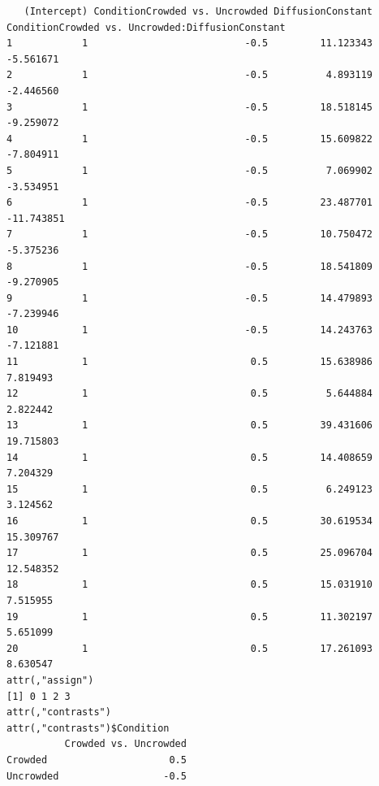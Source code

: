 \documentclass[
]{article}
\begin{document}
\begin{verbatim}
   (Intercept) ConditionCrowded vs. Uncrowded DiffusionConstant ConditionCrowded vs. Uncrowded:DiffusionConstant
1            1                           -0.5         11.123343                                        -5.561671
2            1                           -0.5          4.893119                                        -2.446560
3            1                           -0.5         18.518145                                        -9.259072
4            1                           -0.5         15.609822                                        -7.804911
5            1                           -0.5          7.069902                                        -3.534951
6            1                           -0.5         23.487701                                       -11.743851
7            1                           -0.5         10.750472                                        -5.375236
8            1                           -0.5         18.541809                                        -9.270905
9            1                           -0.5         14.479893                                        -7.239946
10           1                           -0.5         14.243763                                        -7.121881
11           1                            0.5         15.638986                                         7.819493
12           1                            0.5          5.644884                                         2.822442
13           1                            0.5         39.431606                                        19.715803
14           1                            0.5         14.408659                                         7.204329
15           1                            0.5          6.249123                                         3.124562
16           1                            0.5         30.619534                                        15.309767
17           1                            0.5         25.096704                                        12.548352
18           1                            0.5         15.031910                                         7.515955
19           1                            0.5         11.302197                                         5.651099
20           1                            0.5         17.261093                                         8.630547
attr(,"assign")
[1] 0 1 2 3
attr(,"contrasts")
attr(,"contrasts")$Condition
          Crowded vs. Uncrowded
Crowded                     0.5
Uncrowded                  -0.5
\end{verbatim}
\end{document}
